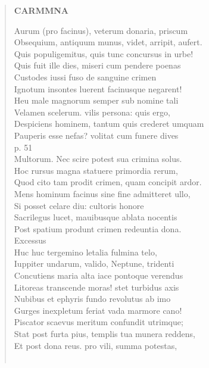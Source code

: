 \documentclass[11pt, a4paper]{report}
\begin{document}
\begin{verse}
     \marginpar{[88]} \begin{center} \textbf{CARMMNA} \end{center}Aurum (pro facinus), veterum donaria, priscum \\ Obsequium, antiquum munus, videt, arripit, aufert. \\ Quis populigemitus, quis tunc concursus in urbe! \\ Quis fuit ille dies, miseri cum pendere poenas \\ Custodes iussi fuso de sanguine crimen \\ Ignotum insontes luerent facinusque negarent! \\ Heu male magnorum semper sub nomine tali \\ Velamen scelerum. vilis persona: quis ergo, \\ Despiciens hominem, tantum quis crederet umquam \\ Pauperis esse nefas? volitat cum funere dives \\ p. 51 \\ Multorum. Nec scire potest sua crimina solus. \\ Hoc rursus magna statuere primordia rerum, \\ Quod cito tam prodit crimen, quam concipit ardor. \\ Mens hominum facinus sine fine admitteret ullo, \\ Si posset celare diu: cultoris honore \\ Sacrilegus lucet, mauibusque ablata nocentis \\ Post spatium produnt crimen redeuntia dona. \\ Excessus \\ Huc huc tergemino letalia fulmina telo, \\ Iuppiter undarum, valido, Neptune, tridenti \\ Concutiens maria alta iace pontoque verendus \\ Litoreas transcende moras! stet turbidus axis \\ Nubibus et ephyris fundo revolutus ab imo \\ Gurges inexpletum feriat vada marmore cano! \\ Piscator scaevus meritum confundit utrimque; \\ Stat post furta pius, templis tua munera reddens, \\ Et post dona reus. pro vili, summa potestas, \\ 
        ﻿\pagebreak 

\end{verse}
\end{document}
